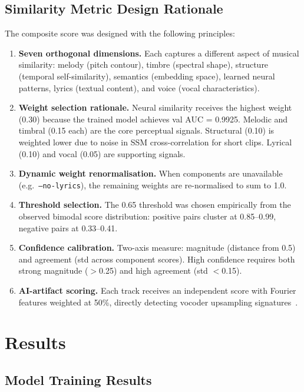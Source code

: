 \documentclass[11pt,a4paper]{article}
\begin{document}
\subsection{Similarity Metric Design Rationale}

The composite score was designed with the following principles:

\begin{enumerate}[nosep]
  \item \textbf{Seven orthogonal dimensions.} Each captures a different aspect of musical similarity: melody (pitch contour), timbre (spectral shape), structure (temporal self-similarity), semantics (embedding space), learned neural patterns, lyrics (textual content), and voice (vocal characteristics).
  \item \textbf{Weight selection rationale.} Neural similarity receives the highest weight (0.30) because the trained model achieves val AUC = 0.9925. Melodic and timbral (0.15 each) are the core perceptual signals. Structural (0.10) is weighted lower due to noise in SSM cross-correlation for short clips. Lyrical (0.10) and vocal (0.05) are supporting signals.
  \item \textbf{Dynamic weight renormalisation.} When components are unavailable (e.g.\ \texttt{--no-lyrics}), the remaining weights are re-normalised to sum to 1.0.
  \item \textbf{Threshold selection.} The 0.65 threshold was chosen empirically from the observed bimodal score distribution: positive pairs cluster at 0.85--0.99, negative pairs at 0.33--0.41.
  \item \textbf{Confidence calibration.} Two-axis measure: magnitude (distance from 0.5) and agreement (std across component scores). High confidence requires both strong magnitude ($>$0.25) and high agreement (std $<$0.15).
  \item \textbf{AI-artifact scoring.} Each track receives an independent score with Fourier features weighted at 50\%, directly detecting vocoder upsampling signatures~\cite{A1}.
\end{enumerate}


\section{Results}
\label{sec:results}

\subsection{Model Training Results}
\end{document}
